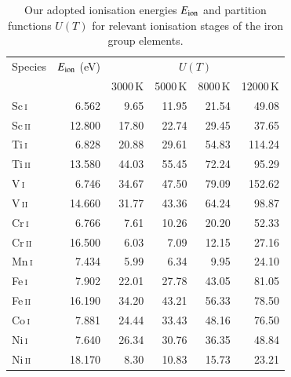 \documentclass[traditabstract]{aa}
\newcommand{\altsci}{Sc\,\textsc{i}}
\newcommand{\altscii}{Sc\,\textsc{ii}}
\newcommand{\alttii}{Ti\,\textsc{i}}
\newcommand{\alttiii}{Ti\,\textsc{ii}}
\newcommand{\altvi}{V\,\textsc{i}}
\newcommand{\altvii}{V\,\textsc{ii}}
\newcommand{\altcri}{Cr\,\textsc{i}}
\newcommand{\altcrii}{Cr\,\textsc{ii}}
\newcommand{\altmni}{Mn\,\textsc{i}}
\newcommand{\altfei}{Fe\,\textsc{i}}
\newcommand{\altfeii}{Fe\,\textsc{ii}}
\newcommand{\altcoi}{Co\,\textsc{i}}
\newcommand{\altnii}{Ni\,\textsc{i}}
\newcommand{\altniii}{Ni\,\textsc{ii}}
\newcommand{\scani}{\altsci\ }
\newcommand{\scanii}{\altscii\ }
\newcommand{\tii}{\alttii\ }
\newcommand{\tiii}{\alttiii\ }
\newcommand{\vi}{\altvi\ }
\newcommand{\vii}{\altvii\ }
\newcommand{\cri}{\altcri\ }
\newcommand{\crii}{\altcrii\ }
\newcommand{\mni}{\altmni\ }
\newcommand{\fei}{\altfei\ }
\newcommand{\feii}{\altfeii\ }
\newcommand{\coi}{\altcoi\ }
\newcommand{\nii}{\altnii\ }
\newcommand{\niii}{\altniii\ }
\begin{document}
\begin{table}
\caption{Our adopted ionisation energies $E_{\rm ion}$ and partition functions $U(T)$ for relevant ionisation stages of the iron group elements.}
\label{table:partition} 
\centering
\begin{tabular}{l r r r r r}
\hline
\hline Species & $E_{\rm ion}$ (eV) &  \multicolumn{4}{c}{$U(T)$} \\
               &                    & 3000\,K & 5000\,K & 8000\,K & 12000\,K \\
\hline
  \scani&   6.562 &      9.65 &     11.95 &     21.54 &     49.08 \\
  \scanii& 12.800 &     17.80 &     22.74 &     29.45 &     37.65 \\
  \tii  &   6.828 &     20.88 &     29.61 &     54.83 &    114.24 \\
  \tiii &  13.580 &     44.03 &     55.45 &     72.24 &     95.29 \\
  \vi   &   6.746 &     34.67 &     47.50 &     79.09 &    152.62 \\
  \vii  &  14.660 &     31.77 &     43.36 &     64.24 &     98.87 \\
  \cri  &   6.766 &      7.61 &     10.26 &     20.20 &     52.33 \\
  \crii &  16.500 &      6.03 &      7.09 &     12.15 &     27.16 \\
  \mni  &   7.434 &      5.99 &      6.34 &      9.95 &     24.10 \\
  \fei  &   7.902 &     22.01 &     27.78 &     43.05 &     81.05 \\
  \feii &  16.190 &     34.20 &     43.21 &     56.33 &     78.50 \\
  \coi  &   7.881 &     24.44 &     33.43 &     48.16 &     76.50 \\
  \nii  &   7.640 &     26.34 &     30.76 &     36.35 &     48.84 \\
  \niii &  18.170 &      8.30 &     10.83 &     15.73 &     23.21 \\
\hline
\end{tabular}
\end{table}
\end{document}
